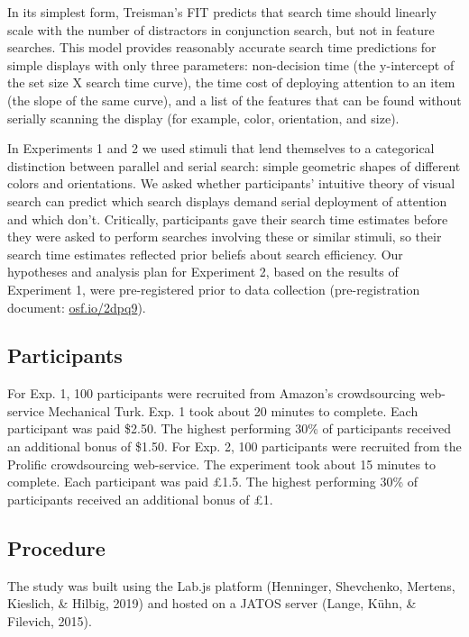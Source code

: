 \documentclass[12pt,twoside]{reedthesis}
\begin{document}
In its simplest form, Treisman's FIT predicts that search time should linearly scale with the number of distractors in conjunction search, but not in feature searches. This model provides reasonably accurate search time predictions for simple displays with only three parameters: non-decision time (the y-intercept of the set size X search time curve), the time cost of deploying attention to an item (the slope of the same curve), and a list of the features that can be found without serially scanning the display (for example, color, orientation, and size).

In Experiments 1 and 2 we used stimuli that lend themselves to a categorical distinction between parallel and serial search: simple geometric shapes of different colors and orientations. We asked whether participants' intuitive theory of visual search can predict which search displays demand serial deployment of attention and which don't. Critically, participants gave their search time estimates before they were asked to perform searches involving these or similar stimuli, so their search time estimates reflected prior beliefs about search efficiency. Our hypotheses and analysis plan for Experiment 2, based on the results of Experiment 1, were pre-registered prior to data collection (pre-registration document: \url{osf.io/2dpq9}).

\hypertarget{participants-2}{%
\subsection{Participants}\label{participants-2}}

For Exp. 1, 100 participants were recruited from Amazon's crowdsourcing web-service Mechanical Turk. Exp. 1 took about 20
minutes to complete. Each participant was paid \$2.50. The highest performing 30\% of participants received an additional bonus of \$1.50. For Exp. 2, 100 participants were recruited from the Prolific crowdsourcing web-service. The experiment took about 15
minutes to complete. Each participant was paid £1.5. The highest performing 30\% of participants received an additional bonus of £1.

\hypertarget{procedure-2}{%
\subsection{Procedure}\label{procedure-2}}

The study was built using the Lab.js platform (Henninger, Shevchenko, Mertens, Kieslich, \& Hilbig, 2019) and hosted on a JATOS server (Lange, Kühn, \& Filevich, 2015).
\end{document}
